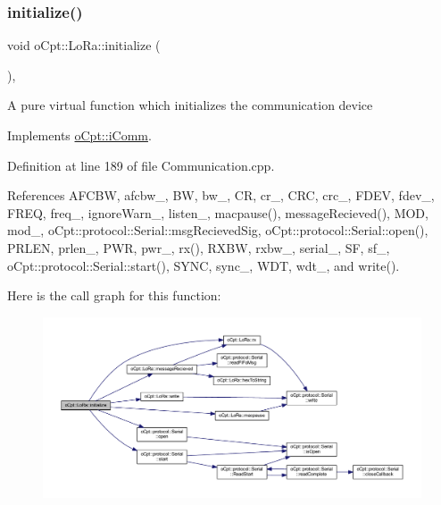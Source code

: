 \subsubsection{\texorpdfstring{initialize()}{initialize()}}
{\footnotesize\ttfamily void o\+Cpt\+::\+Lo\+Ra\+::initialize (\begin{DoxyParamCaption}{ }\end{DoxyParamCaption})\hspace{0.3cm}{\ttfamily [override]}, {\ttfamily [virtual]}}

A pure virtual function which initializes the communication device 

Implements \hyperlink{classo_cpt_1_1i_comm_aeba385b1daaec5e64c5c573424ab8d24}{o\+Cpt\+::i\+Comm}.



Definition at line 189 of file Communication.\+cpp.



References A\+F\+C\+BW, afcbw\+\_\+, BW, bw\+\_\+, CR, cr\+\_\+, C\+RC, crc\+\_\+, F\+D\+EV, fdev\+\_\+, F\+R\+EQ, freq\+\_\+, ignore\+Warn\+\_\+, listen\+\_\+, macpause(), message\+Recieved(), M\+OD, mod\+\_\+, o\+Cpt\+::protocol\+::\+Serial\+::msg\+Recieved\+Sig, o\+Cpt\+::protocol\+::\+Serial\+::open(), P\+R\+L\+EN, prlen\+\_\+, P\+WR, pwr\+\_\+, rx(), R\+X\+BW, rxbw\+\_\+, serial\+\_\+, SF, sf\+\_\+, o\+Cpt\+::protocol\+::\+Serial\+::start(), S\+Y\+NC, sync\+\_\+, W\+DT, wdt\+\_\+, and write().

Here is the call graph for this function\+:\nopagebreak
\begin{figure}[H]
\begin{center}
\leavevmode
\includegraphics[width=350pt]{classo_cpt_1_1_lo_ra_aa0646143f843d43fcd680344dfcb2a14_cgraph}
\end{center}
\end{figure}
\hypertarget{classo_cpt_1_1_lo_ra_ac1042fa7b446ce798317a529b6425a4f}{}\label{classo_cpt_1_1_lo_ra_ac1042fa7b446ce798317a529b6425a4f} 

